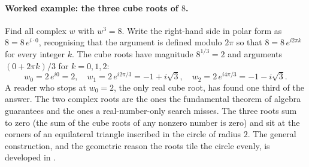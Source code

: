 

\paragraph{Worked example: the three cube roots of $8$.} Find all
complex $w$ with $w^{3} = 8$. Write the right-hand side in polar
form as $8 = 8\,e^{i\cdot 0}$, recognising that the argument is
defined modulo $2\pi$ so that $8 = 8\,e^{i 2\pi k}$ for every
integer $k$. The cube roots have magnitude $8^{1/3} = 2$ and
arguments $(0 + 2\pi k)/3$ for $k = 0, 1, 2$:
\[
w_{0} = 2\,e^{i 0} = 2, \quad
w_{1} = 2\,e^{i 2\pi/3} = -1 + i\sqrt{3}, \quad
w_{2} = 2\,e^{i 4\pi/3} = -1 - i\sqrt{3}.
\]
A reader who stops at $w_{0} = 2$, the only real cube root, has
found one third of the answer. The two complex roots are the ones
the fundamental theorem of algebra guarantees and the ones a
real-number-only search misses. The three roots sum to zero (the
sum of the cube roots of any nonzero number is zero) and sit at the
corners of an equilateral triangle inscribed in the circle of
radius $2$. The general construction, and the geometric reason the
roots tile the circle evenly, is developed in
\cite[chapter 1]{text:v2ch03-stein-shakarchi-complex}.


